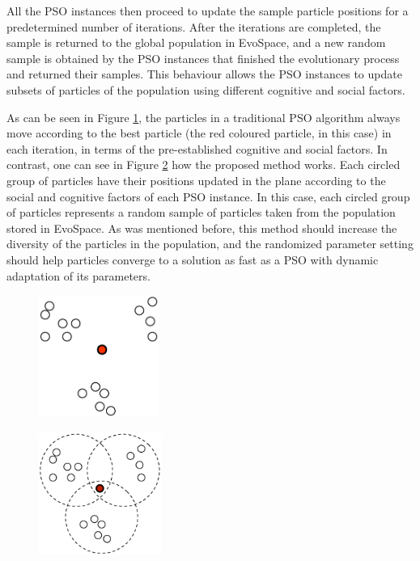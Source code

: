\documentclass[runningheads,a4paper]{llncs}
\begin{document}
All the PSO instances then proceed to update the sample particle
positions for a predetermined number of iterations. After the
iterations are completed, the sample is returned to the global
population in EvoSpace, and a new random sample is obtained by the PSO
instances that finished the evolutionary process and returned their
samples. This behaviour allows the PSO instances to update subsets of
particles of the population using different cognitive and social
factors.

As can be seen in Figure \ref{traditional-pso}, the particles in a
traditional PSO algorithm always move according to the best particle
(the red coloured particle, in this case) in each iteration, in terms
of the pre-established cognitive and
social factors. In contrast, one can see in Figure
\ref{distributed-pso} how the proposed method works. Each circled
group of particles have their positions updated in the plane according to the
social and cognitive factors of each PSO instance. In this case, each
circled group of particles represents a random sample of particles
taken from the population stored in EvoSpace. As was mentioned before,
this method should increase the diversity of the particles in the
population, and the randomized parameter setting should help particles
converge to a solution as fast as a PSO with dynamic adaptation of its
parameters.

\begin{figure}
  \centering
  \includegraphics[height=4cm]{pdf/traditional-pso}
  \caption{}
  \label{traditional-pso}
\end{figure}

\begin{figure}
  \centering
  \includegraphics[height=4cm]{pdf/distributed-pso}
  \caption{}
  \label{distributed-pso}
\end{figure}
\end{document}
